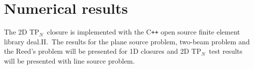 \documentclass[review]{elsarticle}
\newcommand{\pn}{P$_N$}
\newcommand{\psii}[1]{\phi_\ensuremath{{#1}}}
\begin{document}
\section{Numerical results}
The 2D T\pn\ closure is implemented with the C\texttt{++} open source finite element library deal.II\cite{dealii82}.\ The results for the plane source problem, two-beam problem and the Reed's problem will be presented for 1D closures and 2D T\pn\ test results will be presented with line source problem.
\end{document}
